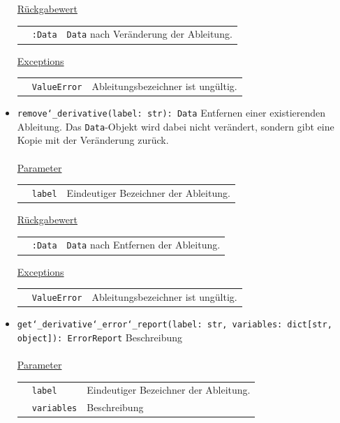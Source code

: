 \documentclass{article}
\begin{document}
\begin{itemize}
\underline{{Rückgabewert}}

\begin{tabular}{lll}
 & \texttt{:Data} & \texttt{Data} nach Veränderung der Ableitung. \\
\end{tabular}

\underline{Exceptions}\\
\begin{tabular}{lll}
 & \texttt{ValueError} & Ableitungsbezeichner ist ungültig.\\
\end{tabular}


\item \texttt{remove\char`_derivative(label: str): Data} \newline Entfernen einer existierenden Ableitung. Das \texttt{Data}-Objekt wird dabei nicht verändert, sondern gibt eine Kopie mit der Veränderung zurück.
\\\\
\underline{{Parameter}}

\begin{tabular}{lll}
 & \texttt{label} & Eindeutiger Bezeichner der Ableitung. \\
\end{tabular}

\underline{{Rückgabewert}}

\begin{tabular}{lll}
 & \texttt{:Data} & \texttt{Data} nach Entfernen der Ableitung. \\
\end{tabular}

\underline{Exceptions}\\
\begin{tabular}{lll}
 & \texttt{ValueError} & Ableitungsbezeichner ist ungültig.\\
\end{tabular}

\item \texttt{get\char`_derivative\char`_error\char`_report(label: str, variables: dict[str, object]): ErrorReport} \newline Beschreibung
\\\\
\underline{{Parameter}}

\begin{tabular}{lll}
 & \texttt{label} & Eindeutiger Bezeichner der Ableitung. \\
 & \texttt{variables} & Beschreibung \\
\end{tabular}


\end{itemize}
\end{document}
